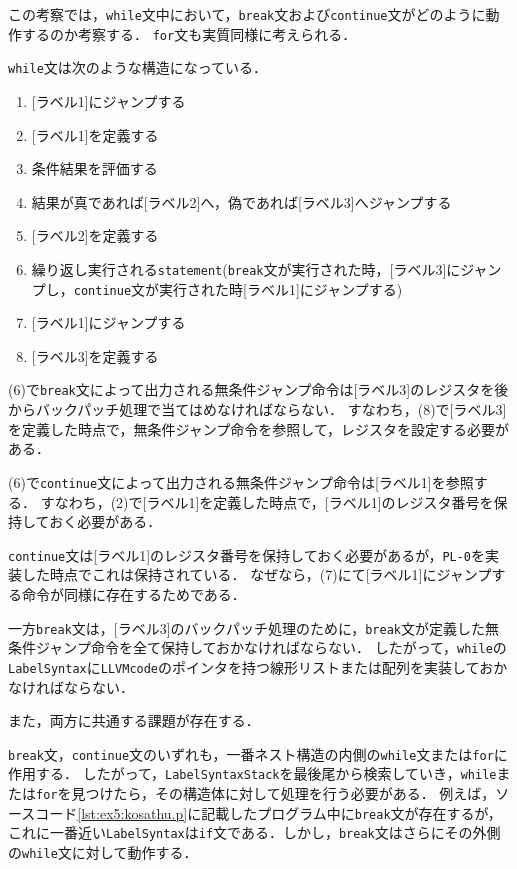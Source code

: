 \documentclass[uplatex]{jsarticle}
\begin{document}
この考察では，\verb#while#文中において，\verb#break#文および\verb#continue#文がどのように動作するのか考察する．
\verb#for#文も実質同様に考えられる．

\verb#while#文は次のような構造になっている．
\begin{enumerate}
  \item {[ラベル1]にジャンプする}
  \item {[ラベル1]を定義する}
  \item {条件結果を評価する}
  \item {結果が真であれば[ラベル2]へ，偽であれば[ラベル3]へジャンプする}
  \item {[ラベル2]を定義する}
  \item {繰り返し実行される\verb#statement#(\verb#break#文が実行された時，[ラベル3]にジャンプし，\verb#continue#文が実行された時[ラベル1]にジャンプする)}
  \item {[ラベル1]にジャンプする}
  \item {[ラベル3]を定義する}
\end{enumerate}

(6)で\verb#break#文によって出力される無条件ジャンプ命令は[ラベル3]のレジスタを後からバックパッチ処理で当てはめなければならない．
すなわち，(8)で[ラベル3]を定義した時点で，無条件ジャンプ命令を参照して，レジスタを設定する必要がある．

(6)で\verb#continue#文によって出力される無条件ジャンプ命令は[ラベル1]を参照する．
すなわち，(2)で[ラベル1]を定義した時点で，[ラベル1]のレジスタ番号を保持しておく必要がある．

\verb#continue#文は[ラベル1]のレジスタ番号を保持しておく必要があるが，\verb#PL-0#を実装した時点でこれは保持されている．
なぜなら，(7)にて[ラベル1]にジャンプする命令が同様に存在するためである．

一方\verb#break#文は，[ラベル3]のバックパッチ処理のために，\verb#break#文が定義した無条件ジャンプ命令を全て保持しておかなければならない．
したがって，\verb#while#の\verb#LabelSyntax#に\verb#LLVMcode#のポインタを持つ線形リストまたは配列を実装しておかなければならない．

また，両方に共通する課題が存在する．\cite{compiler1}

\verb#break#文，\verb#continue#文のいずれも，一番ネスト構造の内側の\verb#while#文または\verb#for#に作用する．
したがって，\verb#LabelSyntaxStack#を最後尾から検索していき，\verb#while#または\verb#for#を見つけたら，その構造体に対して処理を行う必要がある．
例えば，ソースコード\ref{lst:ex5:kosathu.p}に記載したプログラム中に\verb#break#文が存在するが，これに一番近い\verb#LabelSyntax#は\verb#if#文である．しかし，\verb#break#文はさらにその外側の\verb#while#文に対して動作する．
\end{document}
